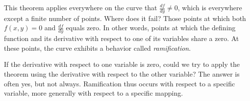 This theorem applies everywhere on the curve that $\frac{df}{dy} \ne 0$,
which is everywhere except a finite number of points.  Where does it
fail?  Those points at which both $f(x,y)=0$ and $\frac{df}{dy}$
equals zero.  In other words, points at which the defining function
and its derivative with respect to one of its variables share
a zero.  At these points, the curve exhibits a behavior
called {\it ramification}.

If the derivative with respect to one variable is zero, could we try
to apply the theorem using the derivative with respect to the other
variable?  The answer is often yes, but not always.  Ramification thus
occurs with respect to a specific variable, more generally with
respect to a specific mapping.





